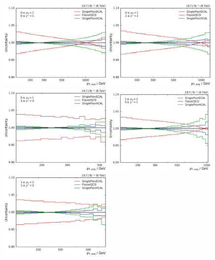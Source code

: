 \begin{figure}[htbp]
    \centering
    \includegraphics[width=0.49\textwidth]{figures/measurement/jec_relunc_1_yb0ys0.pdf}\hfill
    \includegraphics[width=0.49\textwidth]{figures/measurement/jec_relunc_1_yb0ys1.pdf}
    \includegraphics[width=0.49\textwidth]{figures/measurement/jec_relunc_1_yb0ys2.pdf}\hfill
    \includegraphics[width=0.49\textwidth]{figures/measurement/jec_relunc_1_yb1ys0.pdf}
    \includegraphics[width=0.49\textwidth]{figures/measurement/jec_relunc_1_yb1ys1.pdf}\hfill

\end{figure}
